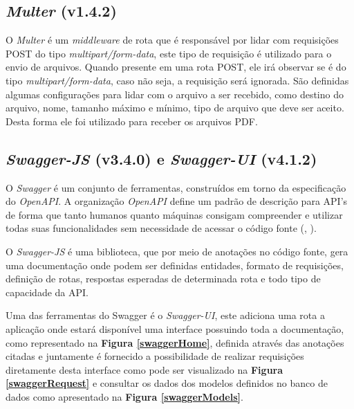 \subsection{\textit{Multer} (v1.4.2)}

O \textit{Multer} é um \textit{middleware} de rota que é responsável por lidar com requisições POST do tipo \textit{multipart/form-data}, este tipo de requisição é utilizado para o envio de arquivos. Quando presente em uma rota POST, ele irá observar se é do tipo \textit{multipart/form-data}, caso não seja, a requisição será ignorada. São definidas algumas configurações para lidar com o arquivo a ser recebido, como destino do arquivo, nome, tamanho máximo e mínimo, tipo de arquivo que deve ser aceito. Desta forma ele foi utilizado para receber os arquivos PDF.

\subsection{\textit{Swagger-JS} (v3.4.0) e \textit{Swagger-UI} (v4.1.2)}

O \textit{Swagger} é um conjunto de ferramentas, construídos em torno da especificação do \textit{OpenAPI}. A organização \textit{OpenAPI} define um padrão de descrição para API's de forma que tanto humanos quanto máquinas consigam compreender e utilizar todas suas funcionalidades sem necessidade de acessar o código fonte (\citeauthor{openapi2017openapi}, \citeyear{openapi2017openapi}). 

O \textit{Swagger-JS} é uma biblioteca, que por meio de anotações no código fonte, gera uma documentação onde podem ser definidas entidades, formato de requisições, definição de rotas, respostas esperadas de determinada rota e todo tipo de capacidade da API. 

Uma das ferramentas do Swagger é o \textit{Swagger-UI}, este adiciona uma rota a aplicação onde estará disponível uma interface possuindo toda a documentação, como representado na \textbf{Figura \ref{swaggerHome}}, definida através das anotações citadas e juntamente é fornecido a possibilidade de realizar requisições diretamente desta interface como pode ser visualizado na \textbf{Figura \ref{swaggerRequest}} e consultar os dados dos modelos definidos no banco de dados como apresentado na \textbf{Figura \ref{swaggerModels}}.

